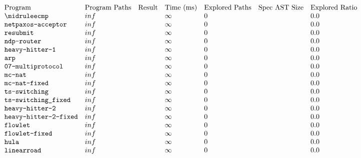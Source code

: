 \footnotesize
\[\begin{array}{l l l l l l l l}
    \text{Program} & \text{Program Paths} &  \text{Result} & \text{Time (ms)} & \text{Explored Paths} & \text{Spec AST Size} & \text{Explored Ratio}\\ \midrule

    \texttt{ecmp} & inf &  & \infty & 0  &  & 0.0 \\

    \texttt{netpaxos-acceptor} & inf &  & \infty & 0  &  & 0.0 \\

    \texttt{resubmit} & inf &  & \infty & 0  &  & 0.0 \\

    \texttt{ndp-router} & inf &  & \infty & 0  &  & 0.0 \\

    \texttt{heavy-hitter-1} & inf &  & \infty & 0  &  & 0.0 \\

    \texttt{arp} & inf &  & \infty & 0  &  & 0.0 \\

    \texttt{07-multiprotocol} & inf &  & \infty & 0  &  & 0.0 \\

    \texttt{mc-nat} & inf &  & \infty & 0  &  & 0.0 \\

    \texttt{mc-nat-fixed} & inf &  & \infty & 0  &  & 0.0 \\

    \texttt{ts-switching} & inf &  & \infty & 0  &  & 0.0 \\

    \texttt{ts-switching\_fixed} & inf &  & \infty & 0  &  & 0.0 \\

    \texttt{heavy-hitter-2} & inf &  & \infty & 0  &  & 0.0 \\

    \texttt{heavy-hitter-2-fixed} & inf &  & \infty & 0  &  & 0.0 \\

    \texttt{flowlet} & inf &  & \infty & 0  &  & 0.0 \\

    \texttt{flowlet-fixed} & inf &  & \infty & 0  &  & 0.0 \\

    \texttt{hula} & inf &  & \infty & 0  &  & 0.0 \\

    \texttt{linearroad} & inf &  & \infty & 0  &  & 0.0 \\


\end{array}\]
